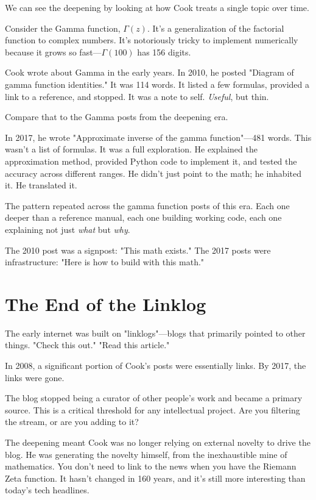 We can see the deepening by looking at how Cook treats a single topic over time.

Consider the Gamma function, $\Gamma(z)$. It's a generalization of the factorial function to complex numbers. It's notoriously tricky to implement numerically because it grows so fast---$\Gamma(100)$ has 156 digits.

Cook wrote about Gamma in the early years. In 2010, he posted "Diagram of gamma function identities." It was 114 words. It listed a few formulas, provided a link to a reference, and stopped. It was a note to self. \textit{Useful}, but thin.

Compare that to the Gamma posts from the deepening era.

In 2017, he wrote "Approximate inverse of the gamma function"---481 words. This wasn't a list of formulas. It was a full exploration. He explained the approximation method, provided Python code to implement it, and tested the accuracy across different ranges. He didn't just point to the math; he inhabited it. He translated it.

The pattern repeated across the gamma function posts of this era. Each one deeper than a reference manual, each one building working code, each one explaining not just \textit{what} but \textit{why}.

The 2010 post was a signpost: "This math exists."
The 2017 posts were infrastructure: "Here is how to build with this math."

\bigskip

\section*{The End of the Linklog}

The early internet was built on "linklogs"---blogs that primarily pointed to other things. "Check this out." "Read this article."

In 2008, a significant portion of Cook's posts were essentially links.
By 2017, the links were gone.

The blog stopped being a curator of other people's work and became a primary source. This is a critical threshold for any intellectual project. Are you filtering the stream, or are you adding to it?

The deepening meant Cook was no longer relying on external novelty to drive the blog. He was generating the novelty himself, from the inexhaustible mine of mathematics. You don't need to link to the news when you have the Riemann Zeta function. It hasn't changed in 160 years, and it's still more interesting than today's tech headlines.

